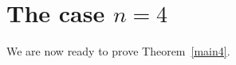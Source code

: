 \documentclass[12pt,reqno]{amsart}
\theoremstyle{dotless}
\newtheorem{lemma}{Lemma}
\begin{document}
\section{The case $n=4$}\label{sec6}
 


 
 We are now ready to prove Theorem~\ref{main4}. 
 
\end{document}

